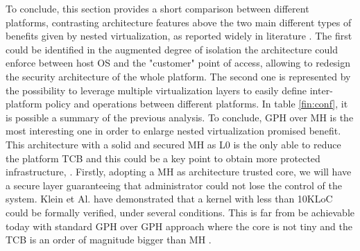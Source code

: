 \documentclass{acm_proc_article-sp} %
\begin{document}
To conclude, this section provides a short comparison between different platforms, contrasting architecture features above the two main different types of benefits given by nested virtualization, as reported widely in literature \cite{art:blan, nested:berghmans,  cloudvisor:zhang, turtle:ibm}. The first could be identified in the augmented degree of isolation the architecture could enforce between host OS and the "customer" point of access, allowing to redesign the security architecture of the whole platform. The second one is represented by the possibility to leverage multiple virtualization layers to easily define inter-platform policy and operations between different platforms.
In table \ref{fin:conf}, it is possible a summary of the previous analysis. To conclude, GPH over MH is the most interesting one in order to enlarge nested virtualization promised benefit. This architecture with a solid and secured MH as L0 is the only able to reduce the platform TCB and this could be a key point to obtain more protected infrastructure, .
Firstly, adopting a MH as architecture trusted core, we will have a secure layer guaranteeing that administrator could not lose the control of the system. Klein et Al. \cite{Klein:2009} have demonstrated that a kernel with less than 10KLoC could be formally verified, under several conditions. This is far from be achievable today with standard GPH over GPH approach where the core is not tiny and the TCB is an order of 
magnitude bigger than MH \cite{nova}. 
\end{document}
